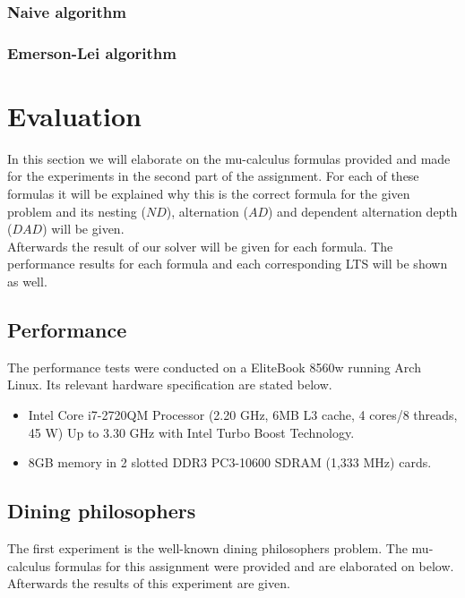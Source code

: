 \documentclass[10pt,a4paper]{article}
\begin{document}
\subsubsection{Naive algorithm}


\subsubsection{Emerson-Lei algorithm}



\section{Evaluation}\label{eval}
In this section we will elaborate on the mu-calculus formulas provided and made for the experiments in the second part of the assignment. For each of these formulas it will be explained why this is the correct formula for the given problem and its nesting ($ND$), alternation ($AD$) and dependent alternation depth ($DAD$) will be given.\\
Afterwards the result of our solver will be given for each formula. The performance results for each formula and each corresponding LTS will be shown as well.

\subsection{Performance}

The performance tests were conducted on a EliteBook 8560w running Arch Linux. Its relevant hardware specification are stated below.

\begin{itemize}
	\item Intel Core i7-2720QM Processor (2.20 GHz, 6MB L3 cache, 4 cores/8 threads, 45 W) Up to 3.30 GHz with Intel Turbo Boost Technology.
	
	\item 8GB memory in 2 slotted DDR3 PC3-10600 SDRAM (1,333 MHz) cards.
\end{itemize}

\subsection{Dining philosophers}
The first experiment is the well-known dining philosophers problem. The mu-calculus formulas for this assignment were provided and are elaborated on below. Afterwards the results of this experiment are given.
\end{document}
